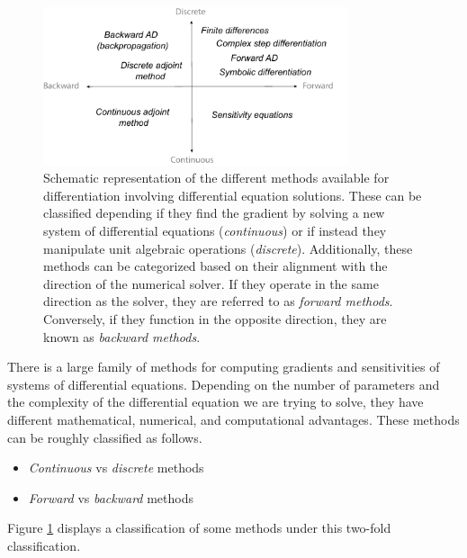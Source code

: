 \begin{figure}[t]
    \centering
    \includegraphics[width=0.80\textwidth]{figures/scheme-methods.pdf}
    \caption{Schematic representation of the different methods available for differentiation involving differential equation solutions. These can be classified depending if they find the gradient by solving a new system of differential equations (\textit{continuous}) or if instead they manipulate unit algebraic operations (\textit{discrete}). Additionally, these methods can be categorized based on their alignment with the direction of the numerical solver. If they operate in the same direction as the solver, they are referred to as \textit{forward methods}. Conversely, if they function in the opposite direction, they are known as \textit{backward methods}.}
    \label{fig:diff}
\end{figure}

There is a large family of methods for computing gradients and sensitivities of systems of differential equations. 
Depending on the number of parameters and the complexity of the differential equation we are trying to solve, they have different mathematical, numerical, and computational advantages.
These methods can be roughly classified as  follows\cite{ma2021comparison}. 
\begin{itemize}
    \item \textit{Continuous} vs \textit{discrete}  methods
    \item \textit{Forward} vs \textit{backward} methods
\end{itemize}
Figure \ref{fig:diff} displays a classification of some methods under this two-fold classification. 

